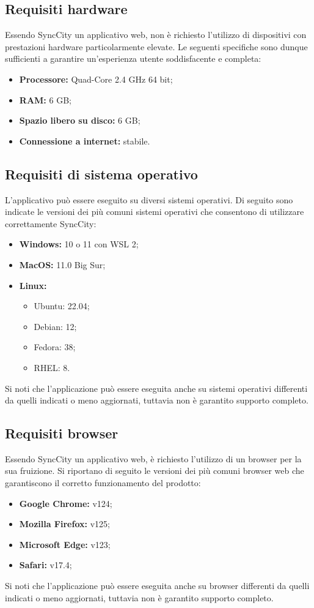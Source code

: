 \documentclass[8pt]{article}
\begin{document}
\subsection{Requisiti hardware}
Essendo SyncCity un applicativo web, non è richiesto l'utilizzo di dispositivi con prestazioni hardware particolarmente elevate. Le seguenti specifiche sono dunque sufficienti a garantire un'esperienza utente soddisfacente e completa:  
\begin{itemize}
\setlength\itemsep{0em}
    \item \textbf{Processore:} Quad-Core 2.4 GHz 64 bit;
    \item \textbf{RAM:} 6 GB;
    \item \textbf{Spazio libero su disco:} 6 GB;
    \item \textbf{Connessione a internet:} stabile.
\end{itemize}
\subsection{Requisiti di sistema operativo}
L'applicativo può essere eseguito su diversi sistemi operativi. Di seguito sono indicate le versioni dei più comuni sistemi operativi che consentono di utilizzare correttamente SyncCity:
\begin{itemize}
\setlength\itemsep{0em}
    \item \textbf{Windows:} 10 o 11 con WSL 2;
    \item \textbf{MacOS:} 11.0 Big Sur;
    \item \textbf{Linux:}
    \begin{itemize}
        \item Ubuntu: 22.04;
        \item Debian: 12;
        \item Fedora: 38;
        \item RHEL: 8.
    \end{itemize}
\end{itemize}
Si noti che l'applicazione può essere eseguita anche su sistemi operativi differenti da quelli indicati o meno aggiornati, tuttavia non è garantito supporto completo.
\subsection{Requisiti browser}
Essendo SyncCity un applicativo web, è richiesto l'utilizzo di un browser per la sua fruizione. Si riportano di seguito le versioni dei più comuni browser web che garantiscono il corretto funzionamento del prodotto:
\begin{itemize}
\setlength\itemsep{0em}
    \item \textbf{Google Chrome:} v124;
    \item \textbf{Mozilla Firefox:} v125;
    \item \textbf{Microsoft Edge:} v123;
    \item \textbf{Safari:} v17.4;
\end{itemize}
Si noti che l'applicazione può essere eseguita anche su browser differenti da quelli indicati o meno aggiornati, tuttavia non è garantito supporto completo.
\newpage
\end{document}
